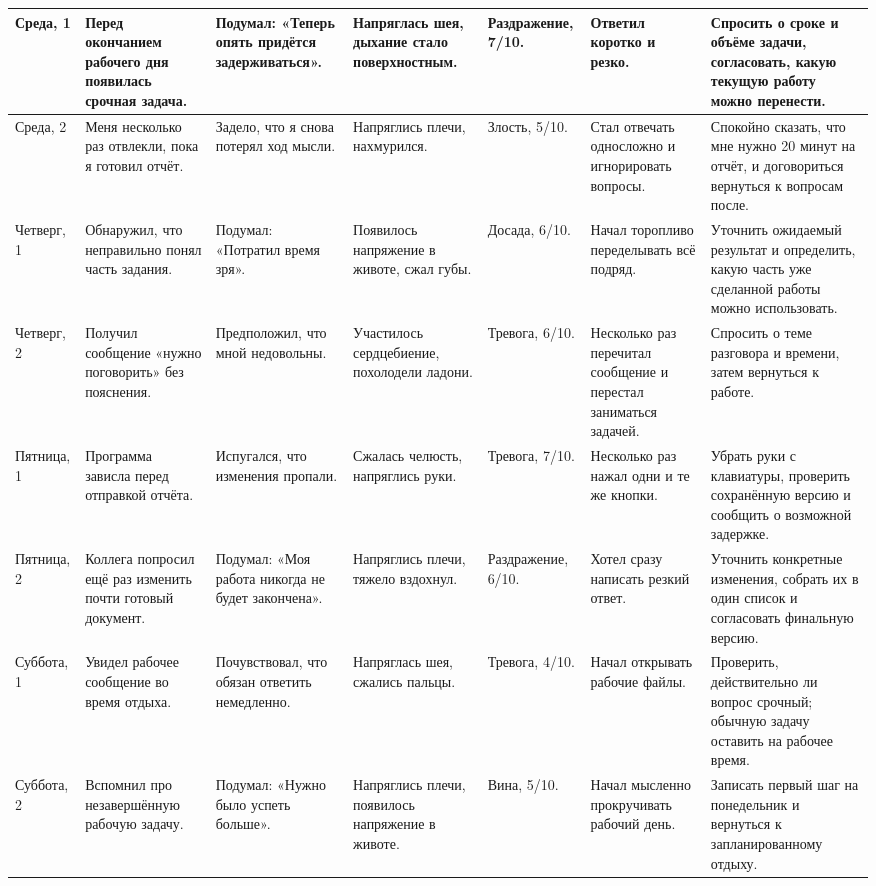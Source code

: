\documentclass[10pt,a4paper]{article}
\begin{document}
\begin{longtable}{|p{19mm}|p{39mm}|p{37mm}|p{31mm}|p{20mm}|p{35mm}|p{51mm}|}
Среда, 1 & Перед окончанием рабочего дня появилась срочная задача. & Подумал: «Теперь опять придётся задерживаться». & Напряглась шея, дыхание стало поверхностным. & Раздражение, 7/10. & Ответил коротко и резко. & Спросить о сроке и объёме задачи, согласовать, какую текущую работу можно перенести.\\\hline
Среда, 2 & Меня несколько раз отвлекли, пока я готовил отчёт. & Задело, что я снова потерял ход мысли. & Напряглись плечи, нахмурился. & Злость, 5/10. & Стал отвечать односложно и игнорировать вопросы. & Спокойно сказать, что мне нужно 20 минут на отчёт, и договориться вернуться к вопросам после.\\\hline
Четверг, 1 & Обнаружил, что неправильно понял часть задания. & Подумал: «Потратил время зря». & Появилось напряжение в животе, сжал губы. & Досада, 6/10. & Начал торопливо переделывать всё подряд. & Уточнить ожидаемый результат и определить, какую часть уже сделанной работы можно использовать.\\\hline
Четверг, 2 & Получил сообщение «нужно поговорить» без пояснения. & Предположил, что мной недовольны. & Участилось сердцебиение, похолодели ладони. & Тревога, 6/10. & Несколько раз перечитал сообщение и перестал заниматься задачей. & Спросить о теме разговора и времени, затем вернуться к работе.\\\hline
Пятница, 1 & Программа зависла перед отправкой отчёта. & Испугался, что изменения пропали. & Сжалась челюсть, напряглись руки. & Тревога, 7/10. & Несколько раз нажал одни и те же кнопки. & Убрать руки с клавиатуры, проверить сохранённую версию и сообщить о возможной задержке.\\\hline
Пятница, 2 & Коллега попросил ещё раз изменить почти готовый документ. & Подумал: «Моя работа никогда не будет закончена». & Напряглись плечи, тяжело вздохнул. & Раздражение, 6/10. & Хотел сразу написать резкий ответ. & Уточнить конкретные изменения, собрать их в один список и согласовать финальную версию.\\\hline
Суббота, 1 & Увидел рабочее сообщение во время отдыха. & Почувствовал, что обязан ответить немедленно. & Напряглась шея, сжались пальцы. & Тревога, 4/10. & Начал открывать рабочие файлы. & Проверить, действительно ли вопрос срочный; обычную задачу оставить на рабочее время.\\\hline
Суббота, 2 & Вспомнил про незавершённую рабочую задачу. & Подумал: «Нужно было успеть больше». & Напряглись плечи, появилось напряжение в животе. & Вина, 5/10. & Начал мысленно прокручивать рабочий день. & Записать первый шаг на понедельник и вернуться к запланированному отдыху.\\\hline

\end{longtable}
\end{document}
